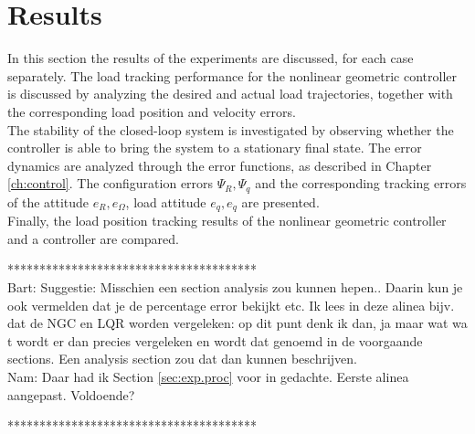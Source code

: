 \newpage
\section{Results}\label{sec:exp.results}
In this section the results of the experiments are discussed, for each case separately. 
The load tracking performance for the nonlinear geometric controller is discussed by analyzing the desired and actual load trajectories,   
together with the corresponding load position and velocity errors.\\
The stability of the closed-loop system is investigated by observing whether the controller is able to bring the system to a stationary final state.
The error dynamics are analyzed through the error functions, as described in Chapter \ref{ch:control}. 
The configuration errors $ \Psi_R, \Psi_q $
and the corresponding tracking errors of the  attitude $ e_R, e_\Omega $, load attitude $ e_q, e_{\dot{q}} $ are presented.\\
Finally, the load position tracking results of the nonlinear geometric controller and a  controller are compared.


***************************************\\
Bart: Suggestie: Misschien een section analysis zou kunnen hepen.. Daarin kun je ook vermelden dat je de percentage error bekijkt etc. 
Ik lees in deze alinea bijv. dat de NGC en LQR worden vergeleken: op dit punt denk ik dan, ja maar wat wa t wordt er dan precies vergeleken en wordt dat genoemd in de voorgaande sections. Een analysis section zou dat dan kunnen beschrijven.\\
Nam: Daar had ik Section \ref{sec:exp.proc} voor in gedachte. Eerste alinea aangepast. Voldoende?

***************************************\\

